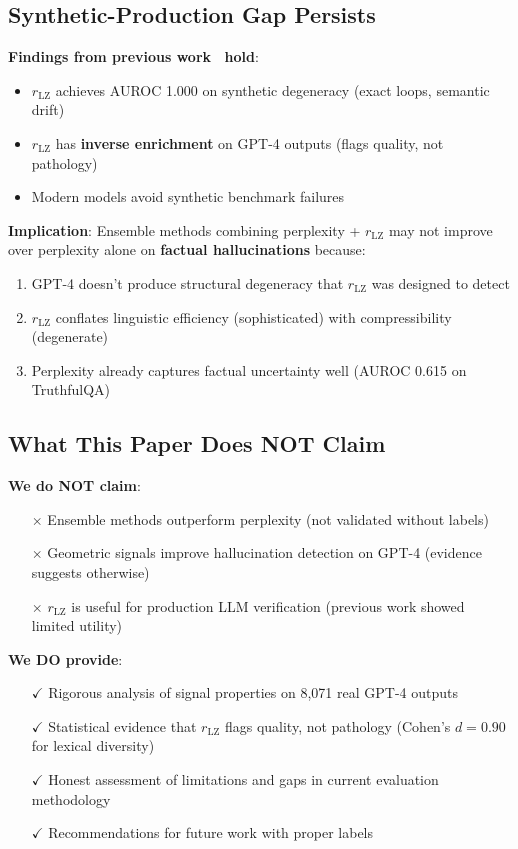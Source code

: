 \documentclass[11pt]{article}
\begin{document}
\subsection{Synthetic-Production Gap Persists}

\textbf{Findings from previous work~\cite{khokhla2025synthetic} hold}:
\begin{itemize}
\item $r_{\text{LZ}}$ achieves AUROC 1.000 on synthetic degeneracy (exact loops, semantic drift)
\item $r_{\text{LZ}}$ has \textbf{inverse enrichment} on GPT-4 outputs (flags quality, not pathology)
\item Modern models avoid synthetic benchmark failures
\end{itemize}

\textbf{Implication}: Ensemble methods combining perplexity + $r_{\text{LZ}}$ may not improve over perplexity alone on \textbf{factual hallucinations} because:
\begin{enumerate}
\item GPT-4 doesn't produce structural degeneracy that $r_{\text{LZ}}$ was designed to detect
\item $r_{\text{LZ}}$ conflates linguistic efficiency (sophisticated) with compressibility (degenerate)
\item Perplexity already captures factual uncertainty well (AUROC 0.615 on TruthfulQA)
\end{enumerate}

\subsection{What This Paper Does NOT Claim}

\textbf{We do NOT claim}:
\begin{itemize}
\item[$\times$] Ensemble methods outperform perplexity (not validated without labels)
\item[$\times$] Geometric signals improve hallucination detection on GPT-4 (evidence suggests otherwise)
\item[$\times$] $r_{\text{LZ}}$ is useful for production LLM verification (previous work showed limited utility)
\end{itemize}

\textbf{We DO provide}:
\begin{itemize}
\item[$\checkmark$] Rigorous analysis of signal properties on 8,071 real GPT-4 outputs
\item[$\checkmark$] Statistical evidence that $r_{\text{LZ}}$ flags quality, not pathology (Cohen's $d=0.90$ for lexical diversity)
\item[$\checkmark$] Honest assessment of limitations and gaps in current evaluation methodology
\item[$\checkmark$] Recommendations for future work with proper labels
\end{itemize}
\end{document}
